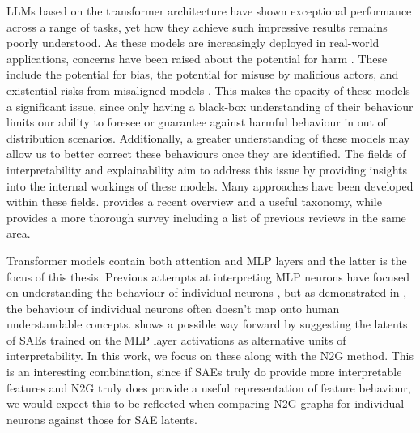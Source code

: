 \Acp{LLM} based on the transformer architecture \parencite{vaswani_attention_2023} have shown exceptional performance across a range of tasks, yet how they achieve such impressive results remains poorly understood.
As these models are increasingly deployed in real-world applications, concerns have been raised about the potential for harm \parencite{noauthor_statement_nodate}\parencite{hendrycks_overview_2023}.
These include the potential for bias, the potential for misuse by malicious actors, and existential risks from misaligned models \parencite{ngo_alignment_2024}.
This makes the opacity of these models a significant issue, since only having a black-box understanding of their behaviour limits our ability to foresee or guarantee against harmful behaviour in out of distribution scenarios.
Additionally, a greater understanding of these models may allow us to better correct these behaviours once they are identified.
The fields of interpretability and explainability aim to address this issue by providing insights into the internal workings of these models.
Many approaches have been developed within these fields.
\textcite{bereska_mechanistic_2024} provides a recent overview and a useful taxonomy, while \textcite{rauker_toward_2023} provides a more thorough survey including a list of previous reviews in the same area.

Transformer models contain both attention and \ac{MLP} layers and the latter is the focus of this thesis.
Previous attempts at interpreting \ac{MLP} neurons have focused on understanding the behaviour of individual neurons \parencite{wang_interpretability_2022}, but as demonstrated in \textcite{elhage_toy_2022}, the behaviour of individual neurons often doesn't map onto human understandable concepts.
\textcite{bricken_towards_2023} shows a possible way forward by suggesting the latents of \acp{SAE} trained on the \ac{MLP} layer activations as alternative units of interpretability.
In this work, we focus on these along with the \ac{N2G} \parencite{foote_neuron_2023} method.
This is an interesting combination, since if \acp{SAE} truly do provide more interpretable features and \ac{N2G} truly does provide a useful representation of feature behaviour, we would expect this to be reflected when comparing \ac{N2G} graphs for individual neurons against those for \ac{SAE} latents.

